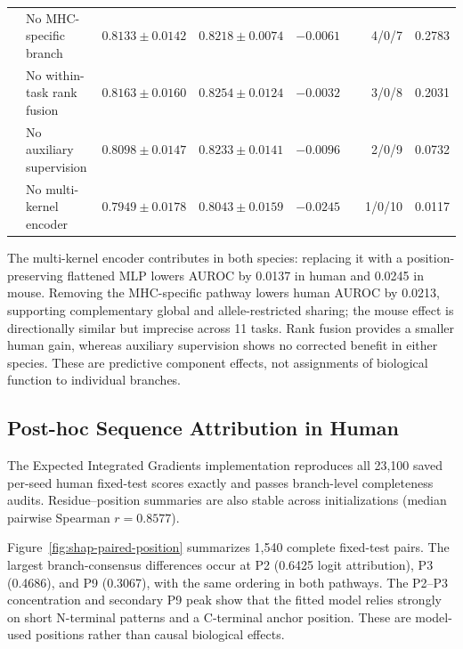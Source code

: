 \begin{table}[t]
\begin{tabularx}{\textwidth}{@{}l>{\raggedright\arraybackslash}Xrrr>{\raggedleft\arraybackslash}p{2.35cm}rr@{}}
& No MHC-specific branch & $0.8133\pm0.0142$ & $0.8218\pm0.0074$ & $-0.0061$ & [$-0.0144,+0.0017$] & 4/0/7 & 0.2783 \\
& No within-task rank fusion & $0.8163\pm0.0160$ & $0.8254\pm0.0124$ & $-0.0032$ & [$-0.0067,+0.0006$] & 3/0/8 & 0.2031 \\
& No auxiliary supervision & $0.8098\pm0.0147$ & $0.8233\pm0.0141$ & $-0.0096$ & [$-0.0155,-0.0035$] & 2/0/9 & 0.0732 \\
& No multi-kernel encoder & $0.7949\pm0.0178$ & $0.8043\pm0.0159$ & $-0.0245$ & [$-0.0333,-0.0148$] & 1/0/10 & 0.0117 \\
\bottomrule
\end{tabularx}
\end{table}

The multi-kernel encoder contributes in both species: replacing it with a position-preserving flattened MLP lowers AUROC by 0.0137 in human and 0.0245 in mouse. Removing the MHC-specific pathway lowers human AUROC by 0.0213, supporting complementary global and allele-restricted sharing; the mouse effect is directionally similar but imprecise across 11 tasks. Rank fusion provides a smaller human gain, whereas auxiliary supervision shows no corrected benefit in either species. These are predictive component effects, not assignments of biological function to individual branches.

\subsection{Post-hoc Sequence Attribution in Human}

The Expected Integrated Gradients implementation reproduces all 23,100 saved per-seed human fixed-test scores exactly and passes branch-level completeness audits. Residue--position summaries are also stable across initializations (median pairwise Spearman \(r=0.8577\)).

Figure~\ref{fig:shap-paired-position} summarizes 1,540 complete fixed-test pairs. The largest branch-consensus differences occur at P2 (0.6425 logit attribution), P3 (0.4686), and P9 (0.3067), with the same ordering in both pathways. The P2--P3 concentration and secondary P9 peak show that the fitted model relies strongly on short N-terminal patterns and a C-terminal anchor position. These are model-used positions rather than causal biological effects.

